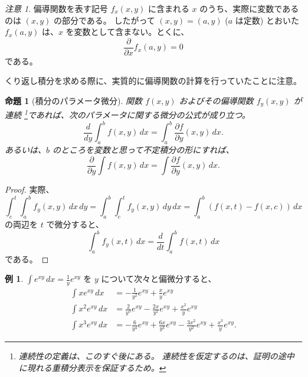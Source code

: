 \documentclass[a4paper]{jsarticle}
\newtheorem{Proposition}[Theorem]{命題}
\theoremstyle{definition}
\newtheorem{Example}[Theorem]{例}
\theoremstyle{remark}
\newtheorem{Remark}{注意}
\begin{document}
\begin{Remark}{\small
偏導関数を表す記号 $f_x(x,y)$ に含まれる $x$ のうち、実際に変数であるのは $(x,y)$ の部分である。
したがって $(x,y) = (a,y)$ ($a$ は定数) とおいた $f_x(a,y)$ は、$x$ を変数として含まない。とくに、
\[ 
\frac{\partial}{\partial x} f_x(a,y) = 0 
\]
である。}
\end{Remark}


くり返し積分を求める際に、実質的に偏導関数の計算を行っていたことに注意。

\begin{Proposition}[積分のパラメータ微分]
関数 $f(x,y)$ およびその偏導関数 $f_y(x,y)$ が連続
\footnote{
連続性の定義は、このすぐ後にある。
連続性を仮定するのは、証明の途中に現れる重積分表示を保証するため。
}であれば、次のパラメータに関する微分の公式が成り立つ。
\[
\frac{d}{dy} \int_a^b f(x,y)\, dx = \int_a^b\frac{\partial f}{\partial y}(x,y)\, dx. 
\]
あるいは、$b$ のところを変数と思って不定積分の形にすれば、
\[ 
\frac{\partial}{\partial y} \int f(x,y)\, dx = 
\int \frac{\partial f}{\partial y}(x,y)\, dx. 
\] 
\end{Proposition}

\begin{proof}
実際、
\[
\int_c^t \int_a^b f_y(x,y)\,dx\,dy 
= \int_a^b \int_c^t f_y(x,y)\,dy\,dx
= \int_a^b (f(x,t) - f(x,c))\, dx 
\]
の両辺を $t$ で微分すると、
\[
\int_a^b f_y(x,t)\, dx = \frac{d}{dt} \int_a^b f(x,t)\, dx
\]
である。
\end{proof}

\begin{Example} 
$\displaystyle \int e^{xy}\, dx = \frac{1}{y} e^{xy}$ を $y$ について次々と偏微分すると、
\begin{align*}
\int x e^{xy}\, dx &= - \frac{1}{y^2} e^{xy} + \frac{x}{y} e^{xy}\\ 
\int x^2e^{xy}\, dx &= \frac{2}{y^3} e^{xy} - \frac{2x}{y^2} e^{xy} + \frac{x^2}{y} e^{xy}\\ 
\int x^3 e^{xy}\, dx &= - \frac{6}{y^4} e^{xy} + \frac{6x}{y^3} e^{xy} - \frac{3x^2}{y^2} e^{xy} 
+ \frac{x^3}{y} e^{xy}. 
\end{align*}
\end{Example} 
\end{document}
